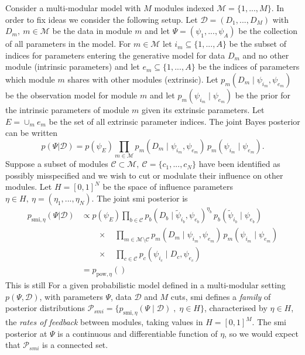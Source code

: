 Consider a multi-modular model with $M$ modules indexed $\mathcal{M}=\{1,...,M\}$. In order to fix ideas we consider the following setup. Let $\mathcal{D}=(D_1,...,D_M)$ with $D_m,\ m\in \mathcal{M}$ be the data in module $m$ and let $\Psi=(\psi_1,...,\psi_A)$ be the collection of all parameters in the model. For $m\in \mathcal{M}$ let $i_m\subseteq \{1,...,A\}$ be the subset of indices for parameters entering the generative model for data $D_m$ and no other module (intrinsic parameters) and  let $e_{m}\subseteq \{1,...,A\}$ be the indices of parameters which module $m$ shares with other modules (extrinsic).
Let $p_m(D_m \mid \psi_{i_m},\psi_{e_m})$ be the observation model for module $m$ and let $p_m(\psi_{i_m} \mid \psi_{e_m})$ be the prior for the intrinsic parameters of module $m$ given its extrinsic parameters.
Let $E=\cup_m e_m$ be the set of all extrinsic parameter indices. The joint Bayes posterior can be written
\begin{equation}
  p(\Psi|\mathcal{D}) = p(\psi_{E})\prod_{m\in \mathcal{M}} p_m(D_m \mid \psi_{i_m},\psi_{e_m})\, p_m(\psi_{i_m} \mid \psi_{e_m}).
\end{equation}
Suppose a subset of modules $\mathcal{C}\subset \mathcal{M},\ \mathcal{C}=\{c_1,...,c_N\}$ have been identified as possibly misspecified and we wish to cut or modulate their influence on other modules.
Let $H=[0,1]^N$ be the space of influence parameters $\eta\in H,\ \eta=(\eta_1,...,\eta_N)$. The joint \acrshort{smi} posterior is
\begin{align}
  p_{\text{smi},\eta}(\Psi|\mathcal{D}) & \propto p(\psi_{E})\prod_{b\in \mathcal{C}}
  p_b(D_b\mid\tilde\psi_{i_b},\psi_{e_b})^{\eta_b}\, p_b(\tilde\psi_{i_b} \mid \psi_{e_b})
  \\
                                        & \qquad\times\quad
  \prod_{m\in \mathcal{M}\setminus \mathcal{C}} p_m(D_m \mid \psi_{i_m},\psi_{e_m})\, p_m(\psi_{i_m} \mid \psi_{e_m})
  \\
                                        & \qquad\times\quad
  \prod_{c\in \mathcal{C}} p_c(\psi_{i_c} \mid D_c, \psi_{e_c})                       \\
                                        & =p_{\text{pow},\eta}()
\end{align}
This is still
For a given probabilistic model defined in a multi-modular setting $p(\Psi, \mathcal{D})$, with parameters $\Psi$, data $\mathcal{D}$ and $M$ cuts, \acrlong*{smi} defines a \emph{family} of posterior distributions $\mathcal{P}_{smi}=\{p_{ \text{smi}, \eta}(\Psi \mid \mathcal{D}) \;,\;\eta \in H \}$, characterised by $\eta \in H$, the \emph{rates of feedback} between modules, taking values in $H=[0,1]^M$.
The \acrshort*{smi} posterior at $\Psi$ is a continuous and differentiable function of $\eta$, so we would expect that $\mathcal{P}_{smi}$ is a connected set.


